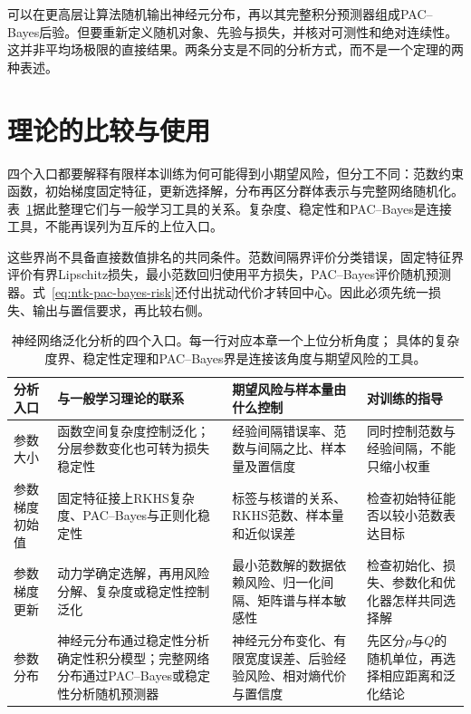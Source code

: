 可以在更高层让算法随机输出神经元分布，再以其完整积分预测器组成PAC--Bayes后验。但要重新定义随机对象、先验与损失，并核对可测性和绝对连续性。这并非平均场极限的直接结果。两条分支是不同的分析方式，而不是一个定理的两种表述。

\FloatBarrier
\section{理论的比较与使用}
\label{sec:deep-theory-comparison}

四个入口都要解释有限样本训练为何可能得到小期望风险，但分工不同：范数约束函数，初始梯度固定特征，更新选择解，分布再区分群体表示与完整网络随机化。表~\ref{tab:deep-generalization-routes}据此整理它们与一般学习工具的关系。复杂度、稳定性和PAC--Bayes是连接工具，不能再误列为互斥的上位入口。

这些界尚不具备直接数值排名的共同条件。范数间隔界评价分类错误，固定特征界评价有界Lipschitz损失，最小范数回归使用平方损失，PAC--Bayes评价随机预测器。式~\eqref{eq:ntk-pac-bayes-risk}还付出扰动代价才转回中心。因此必须先统一损失、输出与置信要求，再比较右侧。

\begin{table}[!htb]
 \centering
 \small
 \begin{tabular}{p{24mm}p{43mm}p{46mm}p{38mm}}
 \toprule
 分析入口 & 与一般学习理论的联系 & 期望风险与样本量由什么控制 & 对训练的指导\\
 \midrule
 参数大小 & 函数空间复杂度控制泛化；分层参数变化也可转为损失稳定性 & 经验间隔错误率、范数与间隔之比、样本量及置信度 & 同时控制范数与经验间隔，不能只缩小权重\\
 参数梯度初始值 & 固定特征接上RKHS复杂度、PAC--Bayes与正则化稳定性 & 标签与核谱的关系、RKHS范数、样本量和近似误差 & 检查初始特征能否以较小范数表达目标\\
 参数梯度更新 & 动力学确定选解，再用风险分解、复杂度或稳定性控制泛化 & 最小范数解的数据依赖风险、归一化间隔、矩阵谱与样本敏感性 & 检查初始化、损失、参数化和优化器怎样共同选择解\\
 参数分布 & 神经元分布通过稳定性分析确定性积分模型；完整网络分布通过PAC--Bayes或稳定性分析随机预测器 & 神经元分布变化、有限宽度误差、后验经验风险、相对熵代价与置信度 & 先区分$\rho$与$Q$的随机单位，再选择相应距离和泛化结论\\
 \bottomrule
 \end{tabular}
 \caption{神经网络泛化分析的四个入口。每一行对应本章一个上位分析角度；
 具体的复杂度界、稳定性定理和PAC--Bayes界是连接该角度与期望风险的工具。}
 \label{tab:deep-generalization-routes}
\end{table}


